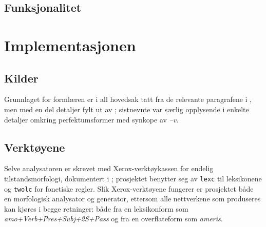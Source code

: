\documentclass{article}
\begin{document}


\subsection{Funksjonalitet}

\section{Implementasjonen}
\subsection{Kilder} %
Grunnlaget for forml\ae{}ren er i all hovedsak tatt fra de relevante
paragrafene i , men med en del detaljer fylt ut av
; sistnevnte var s\ae{}rlig opplysende i enkelte detaljer
omkring perfektumsformer med synkope av \emph{--v}.

\subsection{Verkt\o{}yene}
Selve analysatoren er skrevet med Xerox-verkt\o{}ykassen for endelig
tilstandsmorfologi, dokumentert i ; prosjektet benytter seg av
\texttt{lexc} til leksikonene og \texttt{twolc} for fonetiske regler. Slik
Xerox-verkt\o{}yene fungerer er prosjektet b\aa{}de en morfologisk analysator
og generator, ettersom alle nettverkene som produseres kan kj\o{}res i begge
retninger: b\aa{}de fra en leksikonform som \emph{amo+Verb+Pres+Subj+2S+Pass}
og fra en overflateform som \emph{ameris}.
\end{document}
